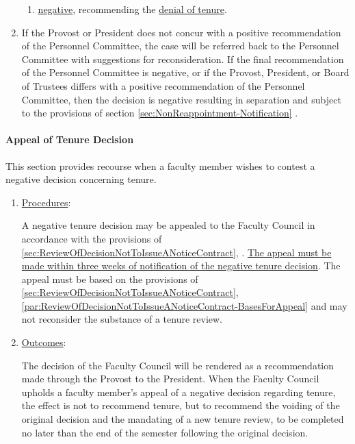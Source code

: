 \begin{enumerate}[label=\alph*)]
{\begin{enumerate}[label=\arabic*)]
{\begin{enumerate}[label=(\alph*)]
									\item{\underline{negative}, recommending the \underline{denial of tenure}.}
								\end{enumerate}
							}
						\end{enumerate}
					}
					\item{If the Provost or President does not concur with a positive recommendation of the Personnel Committee, the case will be referred back to the Personnel Committee with suggestions for reconsideration.  If the final recommendation of the Personnel Committee is negative, or if the Provost, President, or Board of Trustees differs with a positive recommendation of the Personnel Committee, then the decision is negative resulting in separation and subject to the provisions of
						section
						\ref{sec:NonReappointment-Notification}
						.}
				\end{enumerate}
			\paragraph{Appeal of Tenure Decision}
				\label{sec:AppealOfTenureDecision}
				This section provides recourse when a faculty member wishes to contest a negative decision concerning tenure.
				\begin{enumerate}[label=\alph*)]

					\item{\underline{Procedures}:

						A negative tenure decision may be appealed to the Faculty Council in
						accordance with the provisions of
						\ref{sec:ReviewOfDecisionNotToIssueANoticeContract},
						.  \underline{The appeal must
							be made within three weeks of notification of the negative tenure
							decision}.  The appeal must be based on the provisions of
						\ref{sec:ReviewOfDecisionNotToIssueANoticeContract},
						\ref{par:ReviewOfDecisionNotToIssueANoticeContract-BasesForAppeal}
						and may not reconsider the substance of a tenure review.}

					\item{\underline{Outcomes}:

						The decision of the Faculty Council will be rendered as a
						recommendation made through the Provost to the President.  When
						the Faculty Council upholds a faculty member's appeal of a
						negative decision regarding tenure, the effect is not to
						recommend tenure, but to recommend the voiding of the original
						decision and the mandating of a new tenure review, to be
						completed no later than the end of the semester following the
						original decision.}

				\end{enumerate}
